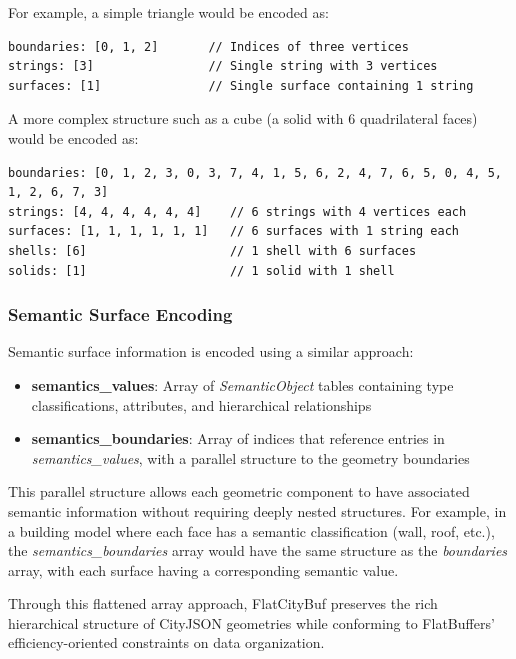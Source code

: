 For example, a simple triangle would be encoded as:

\begin{verbatim}
boundaries: [0, 1, 2]       // Indices of three vertices
strings: [3]                // Single string with 3 vertices
surfaces: [1]               // Single surface containing 1 string
\end{verbatim}

A more complex structure such as a cube (a solid with 6 quadrilateral faces) would be encoded as:

\begin{verbatim}
boundaries: [0, 1, 2, 3, 0, 3, 7, 4, 1, 5, 6, 2, 4, 7, 6, 5, 0, 4, 5, 1, 2, 6, 7, 3]
strings: [4, 4, 4, 4, 4, 4]    // 6 strings with 4 vertices each
surfaces: [1, 1, 1, 1, 1, 1]   // 6 surfaces with 1 string each
shells: [6]                    // 1 shell with 6 surfaces
solids: [1]                    // 1 solid with 1 shell
\end{verbatim}

\subsubsection{Semantic Surface Encoding}
\label{methodology:feature_encoding:geometry_encoding:semantics}

Semantic surface information is encoded using a similar approach:

\begin{itemize}
  \item \textbf{semantics\_values}: Array of \textit{SemanticObject} tables containing type classifications, attributes, and hierarchical relationships
  \item \textbf{semantics\_boundaries}: Array of indices that reference entries in \textit{semantics\_values}, with a parallel structure to the geometry boundaries
\end{itemize}

This parallel structure allows each geometric component to have associated semantic information without requiring deeply nested structures. For example, in a building model where each face has a semantic classification (wall, roof, etc.), the \textit{semantics\_boundaries} array would have the same structure as the \textit{boundaries} array, with each surface having a corresponding semantic value.

Through this flattened array approach, FlatCityBuf preserves the rich hierarchical structure of CityJSON geometries while conforming to FlatBuffers' efficiency-oriented constraints on data organization.

